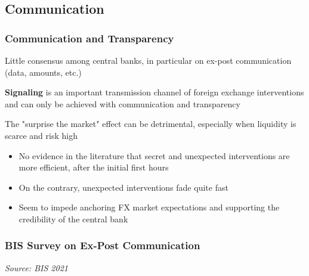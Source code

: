 \documentclass{beamer}
\newenvironment{wideitemize}{\itemize\addtolength{\itemsep}{10pt}}{\enditemize}
\begin{document}
\subsection{Communication}
\begin{frame}
  \frametitle{Communication and Transparency}
  \begin{wideitemize}
  \item Little consensus among central banks, in particular on ex-post communication (data, amounts, etc.)
  \item \textbf{Signaling} is an important transmission channel of foreign exchange interventions and can only be achieved with communication and transparency
  \item The "surprise the market" effect can be detrimental, especially when liquidity is scarce and risk high
    \begin{itemize}
    \item No evidence in the literature that secret and unexpected interventions are more efficient, after the initial first hours
    \item On the contrary, unexpected interventions fade quite fast
    \item Seem to impede anchoring FX market expectations and supporting the credibility of the central bank
    \end{itemize}    
  \end{wideitemize}
\end{frame}

\begin{frame}
  \frametitle{BIS Survey on Ex-Post Communication}
  \medskip
  \emph{Source: BIS 2021 \href{https://www.bis.org/publ/mc_insights_fxinterventions.pdf}{}}
\end{frame}
\end{document}
